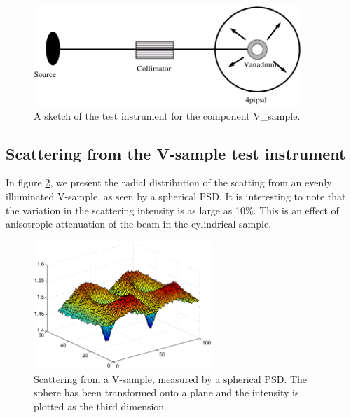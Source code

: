 \begin{figure}
  \begin{center}
    \includegraphics[width=0.9\textwidth]{figures/vanadium}
  \end{center}
\caption{A sketch of the test instrument for the component
V\_sample.}
\label{f:V-instr}
\end{figure}

\subsection{Scattering from the V-sample test instrument}
\label{s:vanadium-result}

In figure \ref{f:V-results}, we present the radial distribution
of the scatting from an evenly illuminated V-sample,
as seen by a spherical PSD.
It is interesting to note that the variation in the
scattering intensity is as large as 10\%. This is an effect
of anisotropic attenuation of the beam in the cylindrical sample.

\begin{figure}
  \begin{center}
    \includegraphics[width=0.6\textwidth]{figures/vanadium-surf-2.eps}
  \end{center}
\caption{Scattering from a V-sample, measured by a spherical
  PSD. The sphere has been transformed onto a plane and the intensity is
  plotted as the third dimension. }
\label{f:V-results}
\end{figure}



